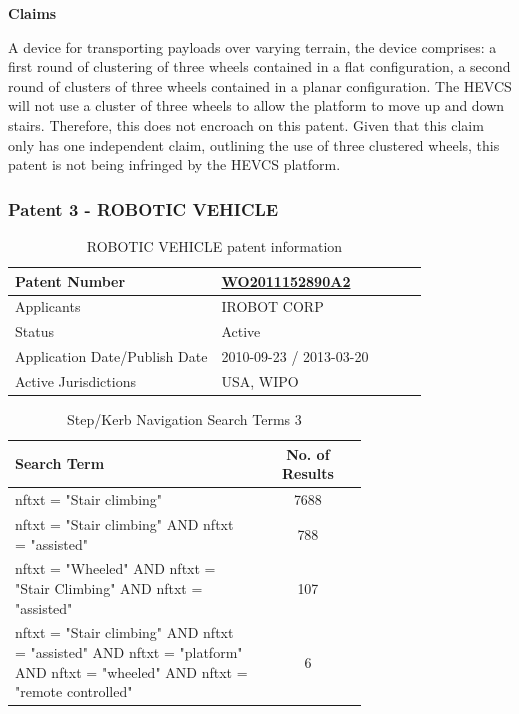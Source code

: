 \documentclass [12pt]{article}
\begin{document}
\textbf{Claims}

A device for transporting payloads over varying terrain, the device comprises: a first round of clustering of three wheels contained in a flat configuration, a second round of clusters of three wheels contained in a planar configuration.
The HEVCS will not use a cluster of three wheels to allow the platform to move up and down stairs. Therefore, this does not encroach on this patent.
Given that this claim only has one independent claim, outlining the use of three clustered wheels, this patent is not being infringed by the HEVCS platform.

\subsubsection{Patent 3 - ROBOTIC VEHICLE}

\begin{table}[H]
    \centering
    \setlength{\arrayrulewidth}{1.5pt}
    \begin{tabular}{|p{0.5\linewidth}|p{0.5\linewidth}|}
    \hline
    Patent Number & \href{https://worldwide.espacenet.com/patent/search/family/044675803/publication/WO2011152890A2?q=WO2011152890A2}{WO2011152890A2}\\
    \hline
    Applicants & IROBOT CORP\\
    \hline
    Status & Active\\
    \hline
    Application Date/Publish Date & 2010-09-23 / 2013-03-20\\
    \hline
    Active Jurisdictions & USA, WIPO\\
    \hline
    \end{tabular}
    \caption{ROBOTIC VEHICLE patent information}
    \label{table:robotic_vehicle_patent_information}
\end{table}

\begin{table}[H]
    \centering
    \setlength{\arrayrulewidth}{1.5pt}
    \begin{tabular}{|p{0.7\linewidth}|c|}
    \hline
    \cellcolor{gray!40}Search Term & \cellcolor{gray!40}No. of Results \\
    \hline
    nftxt = "Stair climbing" & 7688 \\
    \hline
    nftxt = "Stair climbing" AND nftxt = "assisted" & 788 \\
    \hline
    nftxt = "Wheeled" AND nftxt = "Stair Climbing" AND nftxt = "assisted" & 107 \\
    \hline
    nftxt = "Stair climbing" AND nftxt = "assisted" AND nftxt = "platform" AND nftxt = "wheeled" AND nftxt = "remote controlled"& 6 \\
    \hline
    \end{tabular}
    \caption{Step/Kerb Navigation Search Terms 3}
    \label{table:step_Kerb_nav_st_3}
\end{table}
\end{document}
